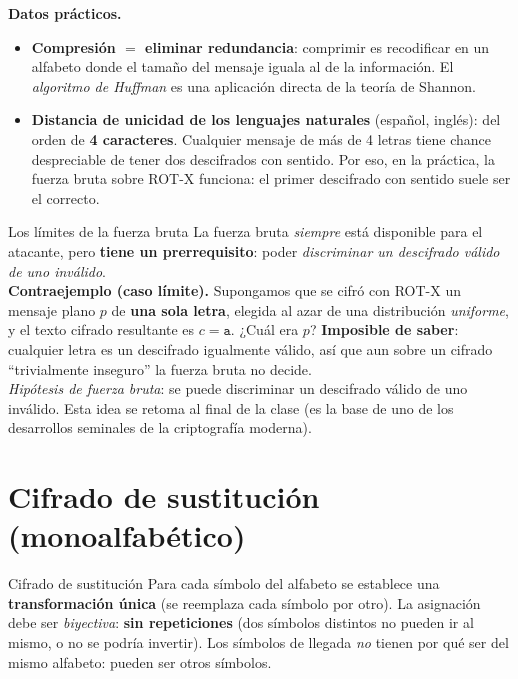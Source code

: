 \documentclass[11pt,a4paper]{article}
\begin{document}
\begin{notebox}
\textbf{Datos prácticos.}
\begin{itemize}[leftmargin=1.3em,itemsep=1pt]
  \item \textbf{Compresión $=$ eliminar redundancia}: comprimir es recodificar en un alfabeto
        donde el tamaño del mensaje iguala al de la información. El \emph{algoritmo de Huffman}
        es una aplicación directa de la teoría de Shannon.
  \item \textbf{Distancia de unicidad de los lenguajes naturales} (español, inglés): del orden
        de \textbf{4 caracteres}. Cualquier mensaje de más de 4 letras tiene chance
        despreciable de tener dos descifrados con sentido. Por eso, en la práctica, la fuerza
        bruta sobre ROT-X funciona: el primer descifrado con sentido suele ser el correcto.
\end{itemize}
\end{notebox}

\begin{warnbox}{Los límites de la fuerza bruta}
La fuerza bruta \emph{siempre} está disponible para el atacante, pero \textbf{tiene un
prerrequisito}: poder \emph{discriminar un descifrado válido de uno inválido}. \\[3pt]
\textbf{Contraejemplo (caso límite).} Supongamos que se cifró con ROT-X un mensaje plano $p$
de \textbf{una sola letra}, elegida al azar de una distribución \emph{uniforme}, y el texto
cifrado resultante es $c=\texttt{a}$. ¿Cuál era $p$? \textbf{Imposible de saber}: cualquier
letra es un descifrado igualmente válido, así que aun sobre un cifrado ``trivialmente
inseguro'' la fuerza bruta no decide. \\[3pt]
\emph{Hipótesis de fuerza bruta}: se puede discriminar un descifrado válido de uno inválido.
Esta idea se retoma al final de la clase (es la base de uno de los desarrollos seminales de la
criptografía moderna).
\end{warnbox}

\section{Cifrado de sustitución (monoalfabético)}

\begin{defbox}{Cifrado de sustitución}
Para cada símbolo del alfabeto se establece una \textbf{transformación única} (se reemplaza
cada símbolo por otro). La asignación debe ser \emph{biyectiva}: \textbf{sin repeticiones}
(dos símbolos distintos no pueden ir al mismo, o no se podría invertir). Los símbolos de
llegada \emph{no} tienen por qué ser del mismo alfabeto: pueden ser otros símbolos.
\end{defbox}
\end{document}
